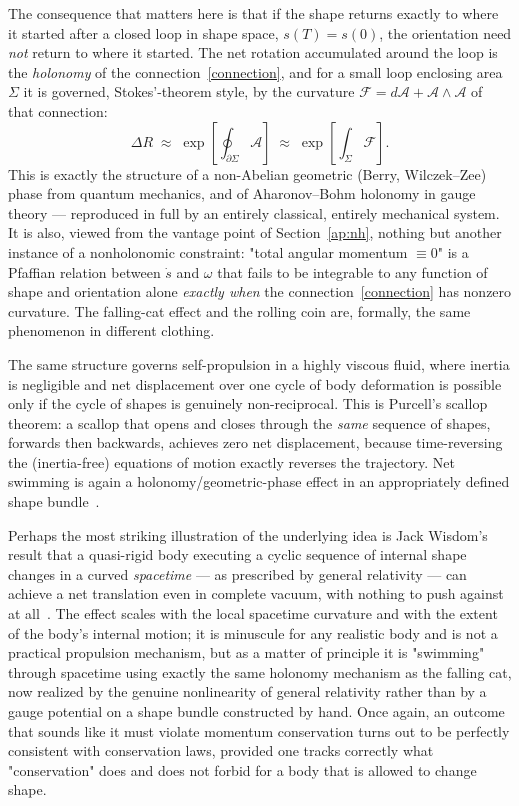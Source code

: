 The consequence that matters here is that if the shape returns
exactly to where it started after a closed loop in shape space,
$s(T) = s(0)$, the orientation need \emph{not} return to where it
started. The net rotation accumulated around the loop is the
\emph{holonomy} of the connection~\eqref{connection}, and for a
small loop enclosing area $\Sigma$ it is governed, Stokes'-theorem
style, by the curvature $\mathcal F = d\mathcal A + \mathcal
A\wedge\mathcal A$ of that connection:
\begin{equation}
  \Delta R \;\approx\; \exp\!\left[\oint_{\partial\Sigma}\mathcal
  A\right] \;\approx\; \exp\!\left[\int_{\Sigma}\mathcal F\right].
  \label{holonomy}
\end{equation}
This is exactly the structure of a non-Abelian geometric (Berry,
Wilczek--Zee) phase from quantum mechanics, and of Aharonov--Bohm
holonomy in gauge theory --- reproduced in full by an entirely
classical, entirely mechanical system. It is also, viewed from the
vantage point of Section~\ref{ap:nh}, nothing but another
instance of a nonholonomic constraint: "total angular momentum
$\equiv 0$" is a Pfaffian relation between $\dot s$ and $\omega$ that
fails to be integrable to any function of shape and orientation
alone \emph{exactly when} the connection~\eqref{connection} has
nonzero curvature. The falling-cat effect and the rolling coin are,
formally, the same phenomenon in different clothing.

The same structure governs self-propulsion in a highly viscous
fluid, where inertia is negligible and net displacement over one
cycle of body deformation is possible only if the cycle of shapes is
genuinely non-reciprocal. This is Purcell's scallop theorem: a
scallop that opens and closes through the \emph{same} sequence of
shapes, forwards then backwards, achieves zero net displacement,
because time-reversing the (inertia-free) equations of motion
exactly reverses the trajectory. Net swimming is again a
holonomy/geometric-phase effect in an appropriately defined shape
bundle~\cite{shapere+wilczek-swim}.

Perhaps the most striking illustration of the underlying idea is Jack
Wisdom's result that a quasi-rigid body executing a cyclic sequence
of internal shape changes in a curved \emph{spacetime} --- as
prescribed by general relativity --- can achieve a net translation
even in complete vacuum, with nothing to push against at
all~\cite{wisdom}. The effect scales with the local spacetime
curvature and with the extent of the body's internal motion; it is
minuscule for any realistic body and is not a practical propulsion
mechanism, but as a matter of principle it is "swimming" through
spacetime using exactly the same holonomy mechanism as the falling
cat, now realized by the genuine nonlinearity of general relativity
rather than by a gauge potential on a shape bundle constructed by
hand. Once again, an outcome that sounds like it must violate
momentum conservation turns out to be perfectly consistent with
conservation laws, provided one tracks correctly what "conservation"
does and does not forbid for a body that is allowed to change shape.


